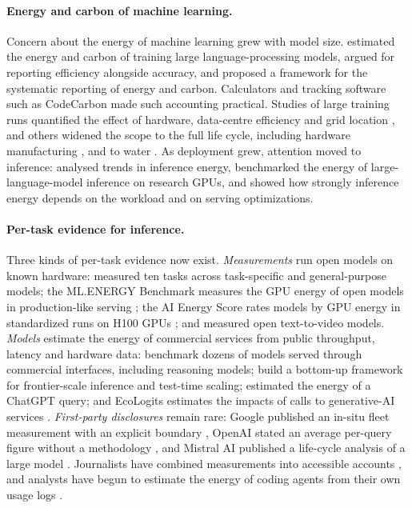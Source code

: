 \documentclass[11pt]{article}
\begin{document}
\paragraph{Energy and carbon of machine learning.}
Concern about the energy of machine learning grew with model size. \citet{strubell2019energy} estimated the energy and carbon of training large language-processing models, \citet{schwartz2020green} argued for reporting efficiency alongside accuracy, and \citet{henderson2020towards} proposed a framework for the systematic reporting of energy and carbon. Calculators \citep{lacoste2019quantifying,lannelongue2021green} and tracking software such as CodeCarbon \citep{courty2026codecarbon} made such accounting practical. Studies of large training runs quantified the effect of hardware, data-centre efficiency and grid location \citep{patterson2021carbon,patterson2022carbon,dodge2022measuring}, and others widened the scope to the full life cycle, including hardware manufacturing \citep{wu2022sustainable,luccioni2023estimating,faiz2024llmcarbon}, and to water \citep{li2025thirsty}. As deployment grew, attention moved to inference: \citet{desislavov2023trends} analysed trends in inference energy, \citet{samsi2023words} benchmarked the energy of large-language-model inference on research GPUs, and \citet{fernandez2025energy} showed how strongly inference energy depends on the workload and on serving optimizations.

\paragraph{Per-task evidence for inference.}
Three kinds of per-task evidence now exist. \emph{Measurements} run open models on known hardware: \citet{luccioni2024power} measured ten tasks across task-specific and general-purpose models; the ML.ENERGY Benchmark measures the GPU energy of open models in production-like serving \citep{chung2025mlenergy}; the AI Energy Score rates models by GPU energy in standardized runs on H100 GPUs \citep{aienergyscore2025}; and \citet{delavande2025videoblog} measured open text-to-video models. \emph{Models} estimate the energy of commercial services from public throughput, latency and hardware data: \citet{jegham2025hungry} benchmark dozens of models served through commercial interfaces, including reasoning models; \citet{oviedo2026energy} build a bottom-up framework for frontier-scale inference and test-time scaling; \citet{you2025chatgpt} estimated the energy of a ChatGPT query; and EcoLogits estimates the impacts of calls to generative-AI services \citep{rince2025ecologits}. \emph{First-party disclosures} remain rare: Google published an in-situ fleet measurement with an explicit boundary \citep{elsworth2025measuring}, OpenAI stated an average per-query figure without a methodology \citep{altman2025gentle}, and Mistral AI published a life-cycle analysis of a large model \citep{mistral2025lca}. Journalists have combined measurements into accessible accounts \citep{odonnell2025math}, and analysts have begun to estimate the energy of coding agents from their own usage logs \citep{couch2026agents,hausfather2026agentic}.
\end{document}
